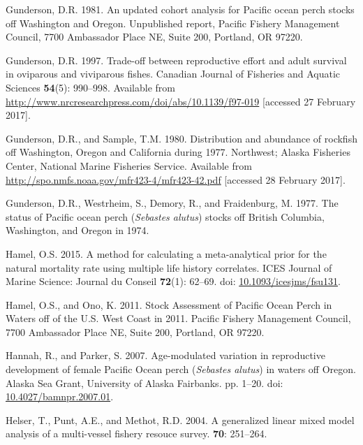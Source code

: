 \documentclass[12pt,]{article}
\begin{document}
\hypertarget{ref-gunderson_updated_1981}{}
Gunderson, D.R. 1981. An updated cohort analysis for Pacific ocean perch
stocks off Washington and Oregon. Unpublished report, Pacific Fishery
Management Council, 7700 Ambassador Place NE, Suite 200, Portland, OR
97220.

\hypertarget{ref-gunderson_trade-off_1997}{}
Gunderson, D.R. 1997. Trade-off between reproductive effort and adult
survival in oviparous and viviparous fishes. Canadian Journal of
Fisheries and Aquatic Sciences \textbf{54}(5): 990--998. Available from
\url{http://www.nrcresearchpress.com/doi/abs/10.1139/f97-019}
{[}accessed 27 February 2017{]}.

\hypertarget{ref-gunderson_distribution_1980}{}
Gunderson, D.R., and Sample, T.M. 1980. Distribution and abundance of
rockfish off Washington, Oregon and California during 1977. Northwest;
Alaska Fisheries Center, National Marine Fisheries Service. Available
from \url{http://spo.nmfs.noaa.gov/mfr423-4/mfr423-42.pdf} {[}accessed
28 February 2017{]}.

\hypertarget{ref-gunderson_status_1977}{}
Gunderson, D.R., Westrheim, S., Demory, R., and Fraidenburg, M. 1977.
The status of Pacific ocean perch (\emph{Sebastes alutus}) stocks off
British Columbia, Washington, and Oregon in 1974.

\hypertarget{ref-hamel_method_2015}{}
Hamel, O.S. 2015. A method for calculating a meta-analytical prior for
the natural mortality rate using multiple life history correlates. ICES
Journal of Marine Science: Journal du Conseil \textbf{72}(1): 62--69.
doi:
\href{https://doi.org/10.1093/icesjms/fsu131}{10.1093/icesjms/fsu131}.

\hypertarget{ref-hamel_stock_2011}{}
Hamel, O.S., and Ono, K. 2011. Stock Assessment of Pacific Ocean Perch
in Waters off of the U.S. West Coast in 2011. Pacific Fishery Management
Council, 7700 Ambassador Place NE, Suite 200, Portland, OR 97220.

\hypertarget{ref-hannah_age-modulated_2007}{}
Hannah, R., and Parker, S. 2007. Age-modulated variation in reproductive
development of female Pacific Ocean perch (\emph{Sebastes alutus}) in
waters off Oregon. Alaska Sea Grant, University of Alaska Fairbanks. pp.
1--20. doi:
\href{https://doi.org/10.4027/bamnpr.2007.01}{10.4027/bamnpr.2007.01}.

\hypertarget{ref-helser_generalized_2004}{}
Helser, T., Punt, A.E., and Methot, R.D. 2004. A generalized linear
mixed model analysis of a multi-vessel fishery resouce survey.
\textbf{70}: 251--264.
\end{document}
